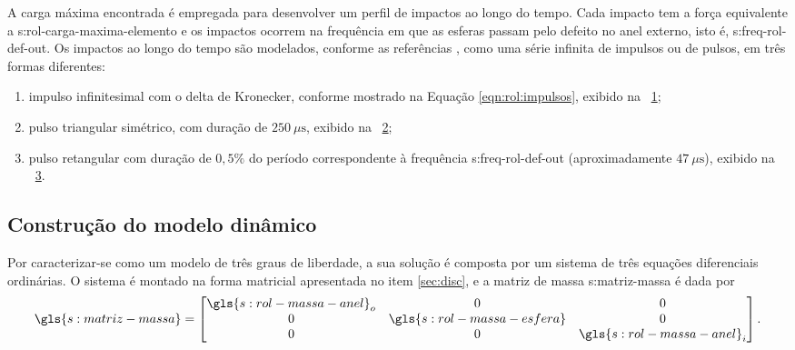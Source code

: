 \documentclass[12pt,oneside,english,brazil,lmodern,siglas,simbolos,cite=num]{ucsmonograph}
\begin{document}
	A carga máxima encontrada é empregada para desenvolver um perfil de impactos ao longo do tempo.
	Cada impacto tem a força equivalente a \gls{s:rol-carga-maxima-elemento} e os impactos ocorrem na frequência em que as esferas passam pelo defeito no anel externo, isto é, \gls{s:freq-rol-def-out}.
	Os impactos ao longo do tempo são modelados, conforme as referências \cite{mcfadden:1984,tandon:1997}, como uma série infinita de impulsos ou de pulsos, em três formas diferentes:
	\begin{enumerate}
		\item impulso infinitesimal com o delta de Kronecker, conforme mostrado na Equação \ref{eqn:rol:impulsos}, exibido na \figurename\ \ref{fig:modelo-imp-kron};
		\item pulso triangular simétrico, com duração de $250\ \mu\text{s}$, exibido na \figurename\ \ref{fig:modelo-imp-tri};
		\item pulso retangular com duração de $0,5\%$ do período correspondente à frequência \gls{s:freq-rol-def-out} (aproximadamente $47\ \mu\text{s}$), exibido na \figurename\ \ref{fig:modelo-imp-rect}.
	\end{enumerate}
	
	\begin{figure}[b]
		\label{fig:modelo-imp-kron}
	\end{figure}
	
	\begin{figure}[ht]
		\label{fig:modelo-imp-tri}
	\end{figure}

	\begin{figure}[ht]
		\label{fig:modelo-imp-rect}
	\end{figure}

	\subsection{Construção do modelo dinâmico}
	Por caracterizar-se como um modelo de três graus de liberdade, a sua solução é composta por um sistema de três equações diferenciais ordinárias.
	O sistema é montado na forma matricial apresentada no item \ref{sec:disc}, e a matriz de massa \gls{s:matriz-massa} é dada por
	\begin{equation*}
		\gls{s:matriz-massa} =
	\begin{bmatrix}
		\gls{s:rol-massa-anel}_o	&	0	&	0\\
		0	&	\gls{s:rol-massa-esfera}	&	0\\
		0	&	0	&	\gls{s:rol-massa-anel}_i
	\end{bmatrix}.
	\end{equation*}
	
\end{document}
